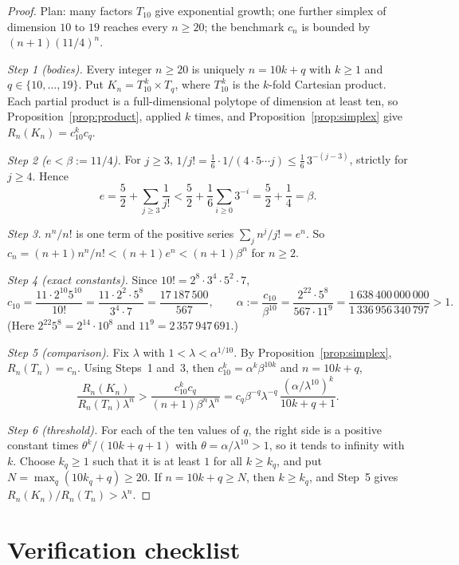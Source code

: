 \documentclass[11pt]{article}
\begin{document}
\begin{proof}
Plan: many factors \(T_{10}\) give exponential growth; one further simplex of dimension \(10\) to \(19\) reaches every \(n\ge20\); the benchmark \(c_n\) is bounded by \((n+1)(11/4)^n\).

\emph{Step 1 (bodies).} Every integer \(n\ge20\) is uniquely \(n=10k+q\) with \(k\ge1\) and \(q\in\{10,\ldots,19\}\). Put \(K_n=T_{10}^{\,k}\times T_q\), where \(T_{10}^{\,k}\) is the \(k\)-fold Cartesian product. Each partial product is a full-dimensional polytope of dimension at least ten, so Proposition~\ref{prop:product}, applied \(k\) times, and Proposition~\ref{prop:simplex} give \(R_n(K_n)=c_{10}^kc_q\).

\emph{Step 2 (\(e<\beta:=11/4\)).} For \(j\ge3\), \(1/j!=\tfrac16\cdot1/(4\cdot5\cdots j)\le\tfrac16\,3^{-(j-3)}\), strictly for \(j\ge4\). Hence
\[
 e=\frac52+\sum_{j\ge3}\frac1{j!}<\frac52+\frac16\sum_{i\ge0}3^{-i}=\frac52+\frac14=\beta.
\]

\emph{Step 3.} \(n^n/n!\) is one term of the positive series \(\sum_jn^j/j!=e^n\). So \(c_n=(n+1)n^n/n!<(n+1)e^n<(n+1)\beta^n\) for \(n\ge2\).

\emph{Step 4 (exact constants).} Since \(10!=2^8\cdot3^4\cdot5^2\cdot7\),
\[
 c_{10}=\frac{11\cdot2^{10}5^{10}}{10!}=\frac{11\cdot2^2\cdot5^8}{3^4\cdot7}=\frac{17\,187\,500}{567},
\qquad
 \alpha:=\frac{c_{10}}{\beta^{10}}=\frac{2^{22}\cdot5^8}{567\cdot11^9}
 =\frac{1\,638\,400\,000\,000}{1\,336\,956\,340\,797}>1 .
\]
(Here \(2^{22}5^8=2^{14}\cdot10^8\) and \(11^9=2\,357\,947\,691\).)

\emph{Step 5 (comparison).} Fix \(\lambda\) with \(1<\lambda<\alpha^{1/10}\). By Proposition~\ref{prop:simplex}, \(R_n(T_n)=c_n\). Using Steps~1 and~3, then \(c_{10}^k=\alpha^k\beta^{10k}\) and \(n=10k+q\),
\[
 \frac{R_n(K_n)}{R_n(T_n)\lambda^n}
 >\frac{c_{10}^kc_q}{(n+1)\beta^n\lambda^n}
 =c_q\beta^{-q}\lambda^{-q}\,\frac{(\alpha/\lambda^{10})^k}{10k+q+1}.
\]

\emph{Step 6 (threshold).} For each of the ten values of \(q\), the right side is a positive constant times \(\theta^k/(10k+q+1)\) with \(\theta=\alpha/\lambda^{10}>1\), so it tends to infinity with \(k\). Choose \(k_q\ge1\) such that it is at least \(1\) for all \(k\ge k_q\), and put \(N=\max_q(10k_q+q)\ge20\). If \(n=10k+q\ge N\), then \(k\ge k_q\), and Step~5 gives \(R_n(K_n)/R_n(T_n)>\lambda^n\).
\end{proof}

\section*{Verification checklist}
\end{document}
